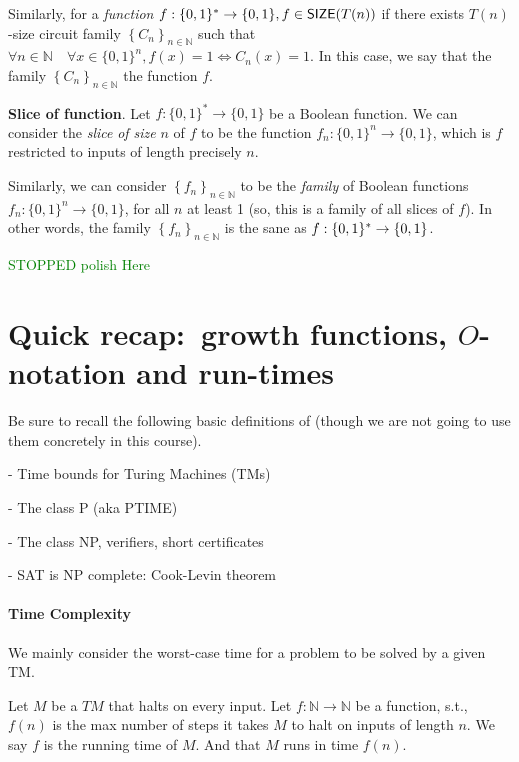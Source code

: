 Similarly, for a \emph{function} $f:\{0,1\}^* \rightarrow\{0,1\}, f \in \operatorname{{\mathsf{SIZE}}}(T(n))$ if there exists $ T(n)$-size circuit family $\left\{C_n\right\}_{n \in \mathbb{N}}$ such that  $\forall n \in \mathbb{N} \quad \forall x \in\{0,1\}^n, f(x)=1 \Leftrightarrow C_n(x)=1$.
In this case, we say that 
the family $\left\{C_n\right\}_{n \in \mathbb{N}}$  the function $f$.



\begin{svgraybox}
\textbf{Slice of function}. 
 Let $f:\{0,1\}^*\to\{0,1\}$ be a Boolean function.
We can consider the \emph{slice} \emph{of size} $n$ of $f$ to be the function $f_n:\{0,1\}^n\to\{0,1\}$, which is $f$ restricted to inputs of length precisely $n$. 
\end{svgraybox}

Similarly, we can consider $\left\{f_{n}\right\}_{n\in\mathbb{N}}$ to be the \textit{family} of Boolean functions $f_n:\{0,1\}^n\to \{0,1\}$, 
for all $n$ at least 1 (so, this is a family of all slices of $f$). In other words, the family $\left\{f_{n}\right\}_{n\in\mathbb{N}}$ is the sane as $f:\{0,1\}^*\to\{0,1\}$. 

\textcolor{green}{STOPPED polish Here
}






\section{Quick recap:\ growth functions, $O$-notation and run-times}

Be sure to recall the following basic definitions of (though we are not going to use them concretely in this course).

- Time bounds for Turing Machines (TMs)

- The class P (aka PTIME)

- The class NP, verifiers, short certificates

- SAT is NP complete: Cook-Levin theorem



\paragraph{Time Complexity}
We mainly consider the worst-case time for a problem to be solved by a given TM.

\begin{definition}
    Let $M$ be a $T M$ that halts on every input. Let $f: \mathbb{N} \rightarrow \mathbb{N}$ be a function, s.t., $f(n)$ is the max number  of steps it takes $M$ to halt on inputs of length $n$. We say $f$ is the running time of $M$. And that $M$ runs in time $f(n)$.
\end{definition}

